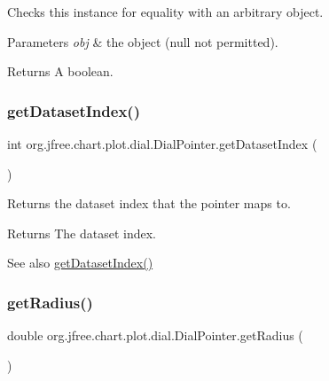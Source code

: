 Checks this instance for equality with an arbitrary object.


\begin{DoxyParams}{Parameters}
{\em obj} & the object ({\ttfamily null} not permitted).\\
\hline
\end{DoxyParams}
\begin{DoxyReturn}{Returns}
A boolean. 
\end{DoxyReturn}
\mbox{\label{classorg_1_1jfree_1_1chart_1_1plot_1_1dial_1_1_dial_pointer_afe96b67f23eb74c9230b3bfd04c5eac8}} 
\subsubsection{\texorpdfstring{get\+Dataset\+Index()}{getDatasetIndex()}}
{\footnotesize\ttfamily int org.\+jfree.\+chart.\+plot.\+dial.\+Dial\+Pointer.\+get\+Dataset\+Index (\begin{DoxyParamCaption}{ }\end{DoxyParamCaption})}

Returns the dataset index that the pointer maps to.

\begin{DoxyReturn}{Returns}
The dataset index.
\end{DoxyReturn}
\begin{DoxySeeAlso}{See also}
\mbox{\hyperlink{classorg_1_1jfree_1_1chart_1_1plot_1_1dial_1_1_dial_pointer_afe96b67f23eb74c9230b3bfd04c5eac8}{get\+Dataset\+Index()}} 
\end{DoxySeeAlso}
\mbox{\label{classorg_1_1jfree_1_1chart_1_1plot_1_1dial_1_1_dial_pointer_a1119de16d3da4dbef956eb3f8567ddb6}} 
\subsubsection{\texorpdfstring{get\+Radius()}{getRadius()}}
{\footnotesize\ttfamily double org.\+jfree.\+chart.\+plot.\+dial.\+Dial\+Pointer.\+get\+Radius (\begin{DoxyParamCaption}{ }\end{DoxyParamCaption})}

